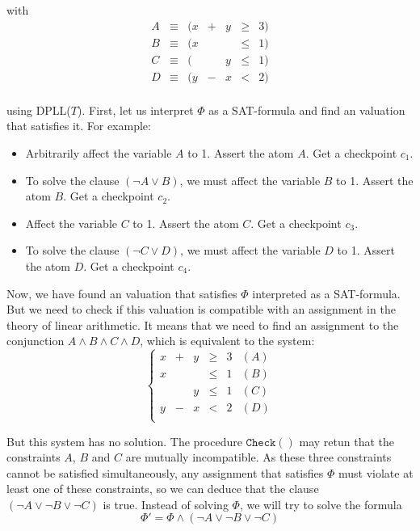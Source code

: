 \documentclass{article}
\newcommand{\icheck}{\mathtt{Check}()}
\begin{document}
with
\begin{displaymath}
\begin{array}{cclcccc}
  A & \equiv & (x & + & y & \geqslant & 3) \\
  B & \equiv & (x &   &   & \leqslant & 1) \\
  C & \equiv & (  &   & y & \leqslant & 1) \\
  D & \equiv & (y & - & x & <         & 2) \\
\end{array}
\end{displaymath}

using DPLL($T$). First, let us interpret $\Phi$ as a SAT-formula and find an
valuation that satisfies it. For example:
\begin{itemize}
  \item Arbitrarily affect the variable $A$ to 1. Assert the atom $A$. Get a
    checkpoint $c_1$.
  \item To solve the clause $(\neg A \vee B)$, we must affect the variable $B$
    to 1. Assert the atom $B$. Get a checkpoint $c_2$.
  \item Affect the variable $C$ to 1. Assert the atom $C$. Get a checkpoint
    $c_3$.
  \item To solve the clause $(\neg C \vee D)$, we must affect the variable $D$
    to 1. Assert the atom $D$. Get a checkpoint $c_4$.
\end{itemize}

Now, we have found an valuation that satisfies $\Phi$ interpreted as a
SAT-formula. But we need to check if this valuation is compatible with an
assignment in the theory of linear arithmetic. It means that we need to find an
assignment to the conjunction $A \wedge B \wedge C \wedge D$, which is equivalent
to the system:
\begin{displaymath}
  \left\{
  \begin{array}{cccccc}
    x  & + & y & \geqslant & 3 & (A) \\
    x  &   &   & \leqslant & 1 & (B) \\
       &   & y & \leqslant & 1 & (C) \\
    y  & - & x & <         & 2 & (D) \\
  \end{array}
  \right.
\end{displaymath}

But this system has no solution. The procedure $\icheck$ may retun that the
constraints $A$, $B$ and $C$ are mutually incompatible. As these three
constraints cannot be satisfied simultaneously, any assignment that satisfies
$\Phi$ must violate at least one of these constraints, so we can deduce that
the clause $(\neg A \vee \neg B \vee \neg C)$ is true. Instead of solving
$\Phi$, we will try to solve the formula
$$\Phi' = \Phi \wedge (\neg A \vee \neg B \vee \neg C)$$
\end{document}
